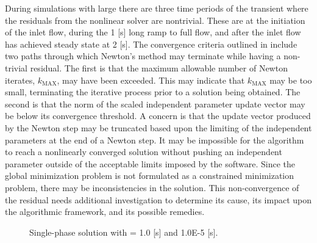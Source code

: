 During simulations with large \dtmax{} there are three time periods of the transient where the residuals from the nonlinear solver are nontrivial.
These are at the initiation of the inlet flow, during the 1 [s] long ramp to full flow, and after the inlet flow has achieved steady state at 2 [s].
The convergence criteria outlined in  include two paths through which Newton's method may terminate while having a non-trivial residual.
The first is that the maximum allowable number of Newton iterates, $k_{\text{MAX}}$, may have been exceeded. 
This may indicate that $k_{\text{MAX}}$ may be too small, terminating the iterative process prior to a solution being obtained.
The second is that the norm of the scaled independent parameter update vector may be below its convergence threshold.
A concern is that the update vector produced by the Newton step may be truncated based upon the limiting of the independent parameters at the end of a Newton step.
It may be impossible for the algorithm to reach a nonlinearly converged solution without pushing an independent parameter outside of the acceptable limits imposed by the software.
Since the global minimization problem is not formulated as a constrained minimization problem, there may be inconsistencies in the solution.
This non-convergence of the residual needs additional investigation to determine its cause, its impact upon the algorithmic framework, and its possible remedies.

\begin{figure}[h!t]
\centering
{}
\caption[Single-phase solution at \dtmax{} = 1.0 {[s]}and 1.0E-5 {[s]}]{Single-phase solution with \dtmax{} = 1.0 {[s]} and 1.0E-5 {[s]}.}
\label{fig:single_compare_1}
\end{figure}

